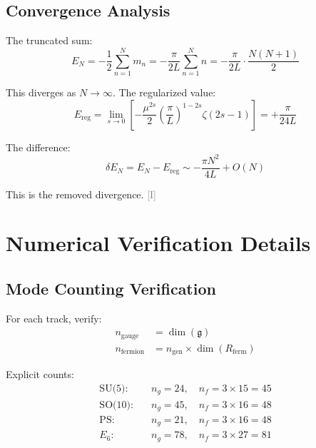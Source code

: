 \documentclass[11pt,a4paper]{article}
\newcommand{\tagI}{\textcolor{gray}{[I]}}
\begin{document}
\subsection{Convergence Analysis}

The truncated sum:
\begin{equation}
\label{eq:app-truncated}
E_N = -\frac{1}{2} \sum_{n=1}^N m_n = -\frac{\pi}{2L} \sum_{n=1}^N n = -\frac{\pi}{2L} \cdot \frac{N(N+1)}{2}
\end{equation}

This diverges as $N \to \infty$. The regularized value:
\begin{equation}
\label{eq:app-reg-value}
E_{\text{reg}} = \lim_{s \to 0} \left[-\frac{\mu^{2s}}{2} \left(\frac{\pi}{L}\right)^{1-2s} \zeta(2s-1)\right] = +\frac{\pi}{24L}
\end{equation}

The difference:
\begin{equation}
\label{eq:app-diff-truncated}
\delta E_N = E_N - E_{\text{reg}} \sim -\frac{\pi N^2}{4L} + O(N)
\end{equation}

This is the removed divergence. \tagI

\section{Numerical Verification Details}
\label{app:numerical}

\subsection{Mode Counting Verification}

For each track, verify:
\begin{align}
\label{eq:app-count-gauge}
n_{\text{gauge}} &= \dim(\mathfrak{g}) \\
\label{eq:app-count-ferm}
n_{\text{fermion}} &= n_{\text{gen}} \times \dim(R_{\text{ferm}})
\end{align}

Explicit counts:
\begin{align}
\label{eq:app-su5-count}
\text{SU(5):} \quad &n_g = 24, \quad n_f = 3 \times 15 = 45 \\
\label{eq:app-so10-count}
\text{SO(10):} \quad &n_g = 45, \quad n_f = 3 \times 16 = 48 \\
\label{eq:app-ps-count}
\text{PS:} \quad &n_g = 21, \quad n_f = 3 \times 16 = 48 \\
\label{eq:app-e6-count}
E_6: \quad &n_g = 78, \quad n_f = 3 \times 27 = 81
\end{align}
\end{document}
